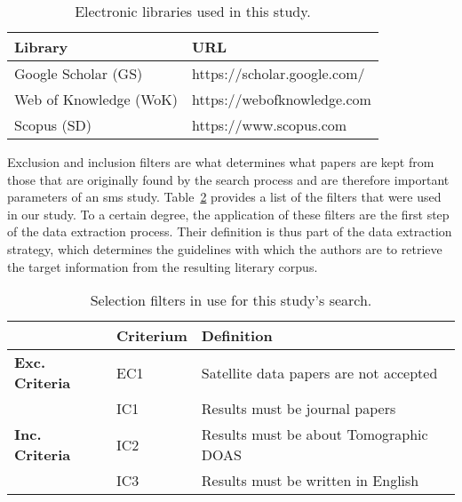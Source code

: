 \begin{table}[htb]
\centering
\caption{Electronic libraries used in this study.}
\label{tab:libraries}
    \begin{tabularx}{\textwidth}{ll}
        \toprule
        \textbf{Library}          & \textbf{URL}\\
        \midrule
        Google Scholar (GS)   & https://scholar.google.com/\\
        Web of Knowledge (WoK)& https://webofknowledge.com\\
        Scopus (SD)   & https://www.scopus.com\\
        \bottomrule
    \end{tabularx}
\end{table}

Exclusion and inclusion filters are what determines what papers are kept
from those that are originally found by the search process and are
therefore important parameters of an \gls{sms} study.
Table~\ref{tab:inx_exc_criteria} provides a list of the filters that were
used in our study. To a certain degree, the application of these filters
are the first step of the data extraction process. Their definition is
thus part of the data extraction strategy, which determines the
guidelines with which the authors are to retrieve the target information
from the resulting literary corpus.

\begin{table}[htb]
\centering
\caption{Selection filters in use for this study's search.}
\label{tab:inx_exc_criteria}
\begin{tabularx}{\textwidth}{lXl}%
\toprule
\multicolumn{1}{l}{} & \textbf{Criterium} & \textbf{Definition} \\ \midrule
\multirow{1}{*}{\textbf{Exc. Criteria}} & EC1 & Satellite data papers
are not accepted \\
\midrule
\multicolumn{1}{l}{\multirow{3}{*}{\textbf{Inc. Criteria}}} & IC1 &
Results must be journal papers \\
\multicolumn{1}{l}{} & IC2 & Results must be about Tomographic DOAS \\ 
\multicolumn{1}{l}{} & IC3 & Results must be written in English \\
\bottomrule
\end{tabularx}
\end{table}

